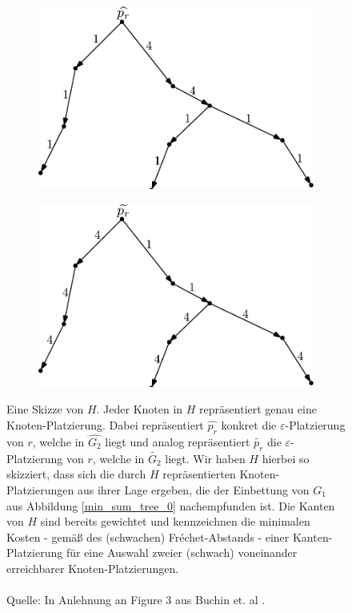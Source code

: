 \documentclass[a4paper, 12pt, twoside]{article}
\theoremstyle{Format1} %
\begin{document}
\begin{figure}[H]
	\centering
	\begin{subfigure}{.5\textwidth}
		\centering
		\includegraphics[width=\linewidth]{min_sum_tree_1.pdf}
	\end{subfigure}%
	\begin{subfigure}{.5\textwidth}
		\centering
		\includegraphics[width=\linewidth]{min_sum_tree_2.pdf}
	\end{subfigure}
	\caption{
	Eine Skizze von $H$. Jeder Knoten in $H$ repräsentiert genau eine Knoten-Platzierung.
	Dabei repräsentiert $\widehat{p_r}$ konkret die $\varepsilon$-Platzierung von $r$, welche in $\widehat{G_2}$ liegt und analog
	repräsentiert $\widetilde{p_r}$ die $\varepsilon$-Platzierung von $r$, welche in $\widetilde{G_2}$ liegt.
	Wir haben $H$ hierbei so skizziert, dass sich die durch $H$ repräsentierten Knoten-Platzierungen aus ihrer Lage ergeben, die
	der Einbettung von $G_1$ aus Abbildung \ref{min_sum_tree_0} nachempfunden ist.
	Die Kanten von $H$ sind bereits gewichtet und kennzeichnen die minimalen Kosten - gemäß des (schwachen) Fréchet-Abstands -
	einer Kanten-Platzierung für eine Auswahl zweier (schwach) voneinander erreichbarer Knoten-Platzierungen.
	\\
	\\
	Quelle: In Anlehnung an Figure 3 aus Buchin et. al \cite{Buchin}.
	}
	\label{min_sum_tree_1}
\end{figure}
\end{document}
